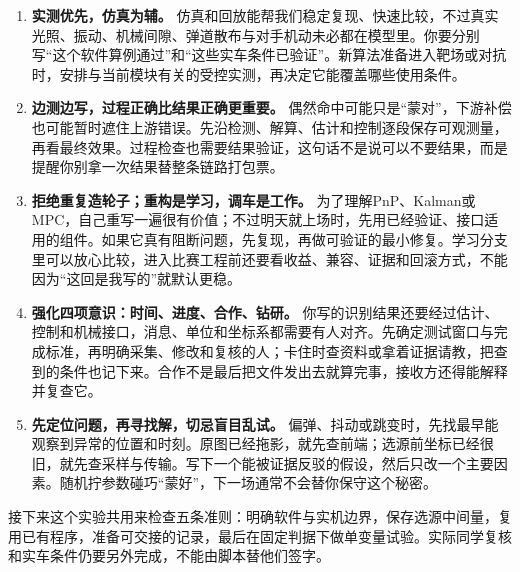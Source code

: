 \begin{enumerate}
  \item \textbf{实测优先，仿真为辅。}
  仿真和回放能帮我们稳定复现、快速比较，不过真实光照、振动、机械间隙、弹道散布与对手机动未必都在模型里。你要分别写“这个软件算例通过”和“这些实车条件已验证”。新算法准备进入靶场或对抗时，安排与当前模块有关的受控实测，再决定它能覆盖哪些使用条件。

  \item \textbf{边测边写，过程正确比结果正确更重要。}
  偶然命中可能只是“蒙对”，下游补偿也可能暂时遮住上游错误。先沿检测、解算、估计和控制逐段保存可观测量，再看最终效果。过程检查也需要结果验证，这句话不是说可以不要结果，而是提醒你别拿一次结果替整条链路打包票。

  \item \textbf{拒绝重复造轮子；重构是学习，调车是工作。}
  为了理解PnP、Kalman或MPC，自己重写一遍很有价值；不过明天就上场时，先用已经验证、接口适用的组件。如果它真有阻断问题，先复现，再做可验证的最小修复。学习分支里可以放心比较，进入比赛工程前还要看收益、兼容、证据和回滚方式，不能因为“这回是我写的”就默认更稳。

  \item \textbf{强化四项意识：时间、进度、合作、钻研。}
  你写的识别结果还要经过估计、控制和机械接口，消息、单位和坐标系都需要有人对齐。先确定测试窗口与完成标准，再明确采集、修改和复核的人；卡住时查资料或拿着证据请教，把查到的条件也记下来。合作不是最后把文件发出去就算完事，接收方还得能解释并复查它。

  \item \textbf{先定位问题，再寻找解，切忌盲目乱试。}
  偏弹、抖动或跳变时，先找最早能观察到异常的位置和时刻。原图已经拖影，就先查前端；选源前坐标已经很旧，就先查采样与传输。写下一个能被证据反驳的假设，然后只改一个主要因素。随机拧参数碰巧“蒙好”，下一场通常不会替你保守这个秘密。
\end{enumerate}

接下来这个实验共用来检查五条准则：明确软件与实机边界，保存选源中间量，复用已有程序，准备可交接的记录，最后在固定判据下做单变量试验。实际同学复核和实车条件仍要另外完成，不能由脚本替他们签字。

